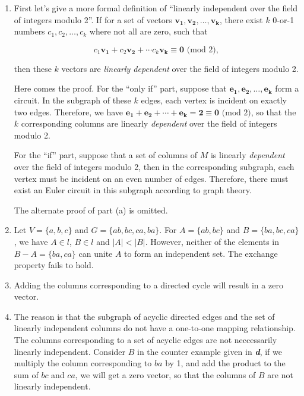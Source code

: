 \documentclass[fleqn]{article}
\begin{document}
\begin{enumerate}
\renewcommand{\labelenumi}{\itshape \bfseries \alph{enumi}.}

\item  %

First let's give a more formal definition of ``linearly independent
over the field of integers modulo 2''. If for a set of vectors
$\mathbf{v_1}, \mathbf{v_2}, \ldots, \mathbf{v_k}$, there exist $k$
0-or-1 numbers $c_1, c_2, \ldots, c_k$ where not all are zero, such
that

\[
c_1\mathbf{v_1} + c_2\mathbf{v_2} + \cdots c_k\mathbf{v_k} \equiv
\mathbf{0} \mbox{ (mod 2)},
\]

then these $k$ vectors are \emph{linearly dependent} over the field of
integers modulo 2.

Here comes the proof. For the ``only if'' part, suppose that
$\mathbf{e_1}, \mathbf{e_2}, \ldots, \mathbf{e_k}$ form a circuit. In
the subgraph of these $k$ edges, each vertex is incident on exactly
two edges. Therefore, we have $\mathbf{e_1} + \mathbf{e_2} + \cdots +
\mathbf{e_k} = \mathbf{2} \equiv \mathbf{0} \mbox{ (mod 2)}$, so that
the $k$ corresponding columns are linearly \emph{dependent} over the
field of integers modulo 2.

For the ``if'' part, suppose that a set of columns of $M$ is linearly
\emph{dependent} over the field of integers modulo 2, then in the
corresponding subgraph, each vertex must be incident on an even number
of edges. Therefore, there must exist an Euler circuit in this
subgraph according to graph theory.

The alternate proof of part (a) is omitted.



\item  %

Let $V = \{a, b, c\}$ and $G = \{ab, bc, ca, ba\}$. For $A = \{ab,
bc\}$ and $B = \{ba, bc, ca\}$, we have $A \in l$, $B \in l$ and $|A|
< |B|$. However, neither of the elements in $B - A = \{ba, ca\}$ can
unite $A$ to form an independent set. The exchange property fails to
hold.


\item  %

Adding the columns corresponding to a directed cycle will result in a
zero vector.


\item  %

The reason is that the subgraph of acyclic directed edges and the set
of linearly independent columns do not have a one-to-one mapping
relationship. The columns corresponding to a set of acyclic edges are
not neccessarily linearly independent. Consider $B$ in the counter
example given in \textit{\textbf{d}}, if we multiply the column
corresponding to $ba$ by 1, and add the product to the sum of $bc$ and
$ca$, we will get a zero vector, so that the columns of $B$ are not
linearly independent.

\end{enumerate}
\end{document}
